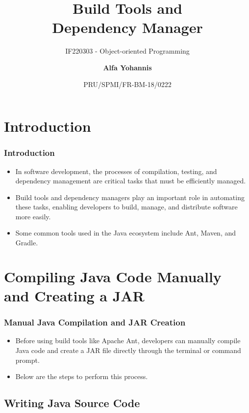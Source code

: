 \documentclass[aspectratio=169, table]{beamer}
\subtitle{IF220303 - Object-oriented Programming}
\title{\LARGE Build Tools and\\Dependency Manager\vspace{10pt}}
\date[Serial]{\scriptsize {PRU/SPMI/FR-BM-18/0222}}
\author[Pradita]{\small {\textbf{Alfa Yohannis}}}
\begin{document}
	
	\frame{\titlepage}
	

\section{Introduction}
\begin{frame}
	\frametitle{Introduction}
	\begin{itemize}
		\item In software development, the processes of compilation, testing, and dependency management are critical tasks that must be efficiently managed.
		\item Build tools and dependency managers play an important role in automating these tasks, enabling developers to build, manage, and distribute software more easily.
		\item Some common tools used in the Java ecosystem include Ant, Maven, and Gradle.
	\end{itemize}
\end{frame}

	
\section{Compiling Java Code Manually and Creating a JAR}

\begin{frame}
	\frametitle{Manual Java Compilation and JAR Creation}
	\begin{itemize}
		\item Before using build tools like Apache Ant, developers can manually compile Java code and create a JAR file directly through the terminal or command prompt.
		\item Below are the steps to perform this process.
	\end{itemize}
\end{frame}

\subsection{Writing Java Source Code}
\end{document}
